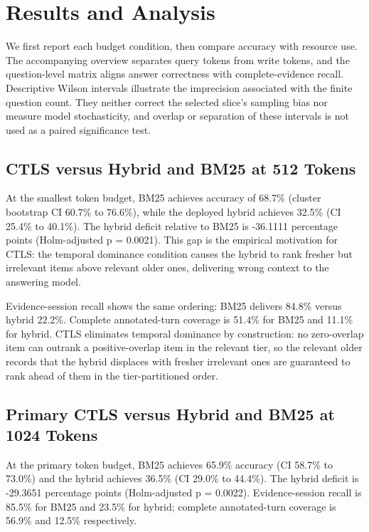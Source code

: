 \section{Results and Analysis}

\label{sec:results}

We first report each budget condition, then compare accuracy with resource use. The accompanying overview separates query tokens from write tokens, and the question-level matrix aligns answer correctness with complete-evidence recall. Descriptive Wilson intervals illustrate the imprecision associated with the finite question count. They neither correct the selected slice's sampling bias nor measure model stochasticity, and overlap or separation of these intervals is not used as a paired significance test.

\subsection{CTLS versus Hybrid and BM25 at 512 Tokens}

\label{sec:result_fair_baselines_512}

At the smallest token budget, BM25 achieves accuracy of 68.7\% (cluster bootstrap CI 60.7\% to 76.6\%), while the deployed hybrid achieves 32.5\% (CI 25.4\% to 40.1\%). The hybrid deficit relative to BM25 is -36.1111 percentage points (Holm-adjusted p = 0.0021). This gap is the empirical motivation for CTLS: the temporal dominance condition causes the hybrid to rank fresher but irrelevant items above relevant older ones, delivering wrong context to the answering model.

Evidence-session recall shows the same ordering: BM25 delivers 84.8\% versus hybrid 22.2\%. Complete annotated-turn coverage is 51.4\% for BM25 and 11.1\% for hybrid. CTLS eliminates temporal dominance by construction: no zero-overlap item can outrank a positive-overlap item in the relevant tier, so the relevant older records that the hybrid displaces with fresher irrelevant ones are guaranteed to rank ahead of them in the tier-partitioned order.

\subsection{Primary CTLS versus Hybrid and BM25 at 1024 Tokens}

\label{sec:result_fair_baselines}

At the primary token budget, BM25 achieves 65.9\% accuracy (CI 58.7\% to 73.0\%) and the hybrid achieves 36.5\% (CI 29.0\% to 44.4\%). The hybrid deficit is -29.3651 percentage points (Holm-adjusted p = 0.0022). Evidence-session recall is 85.5\% for BM25 and 23.5\% for hybrid; complete annotated-turn coverage is 56.9\% and 12.5\% respectively.

